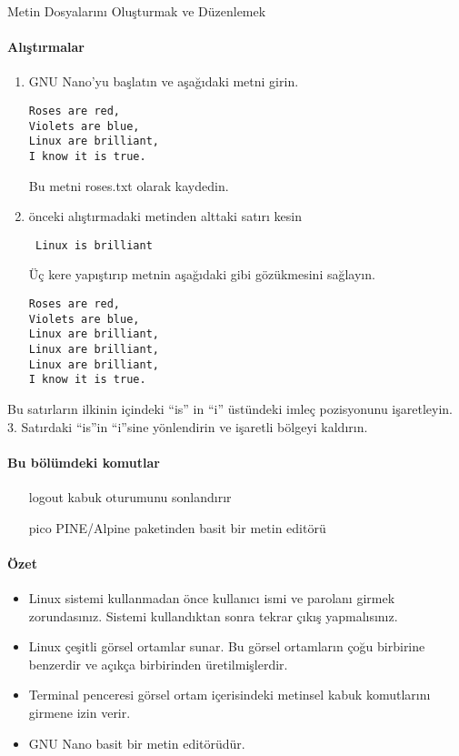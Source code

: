 \begin{section}{Metin Dosyalarını Oluşturmak ve Düzenlemek}
\paragraph{{\Huge{\PencilLeftDown}}Alıştırmalar}{
\begin{enumerate}
 \item GNU Nano’yu başlatın ve aşağıdaki metni girin.
 \begin{verbatim}
Roses are red,
Violets are blue,
Linux are brilliant,
I know it is true.
 \end{verbatim}Bu metni roses.txt olarak kaydedin.
 \item önceki alıştırmadaki metinden alttaki satırı kesin
 \begin{verbatim}
 Linux is brilliant
 \end{verbatim}
 Üç kere yapıştırıp metnin aşağıdaki gibi gözükmesini sağlayın.
 \begin{verbatim}
Roses are red,
Violets are blue,
Linux are brilliant,
Linux are brilliant,
Linux are brilliant,
I know it is true.
 \end{verbatim}
\end{enumerate}}
Bu satırların ilkinin içindeki “is” in “i” üstündeki imleç pozisyonunu işaretleyin. 3. Satırdaki “is”in “i”sine yönlendirin ve işaretli bölgeyi kaldırın.
\end{section}
\paragraph{Bu bölümdeki komutlar}{
\begin{itemize}
\item[logout]kabuk oturumunu sonlandırır
\item[pico]PINE/Alpine paketinden basit bir metin editörü
\end{itemize}}

\paragraph{Özet}{
\begin{itemize}
\item Linux sistemi kullanmadan önce kullanıcı ismi ve parolanı girmek zorundasınız. Sistemi kullandıktan sonra tekrar çıkış yapmalısınız.
\item Linux çeşitli görsel ortamlar sunar. Bu görsel ortamların çoğu birbirine benzerdir ve açıkça birbirinden üretilmişlerdir.
\item Terminal penceresi görsel ortam içerisindeki metinsel kabuk komutlarını girmene izin verir. 
\item GNU Nano basit bir metin editörüdür.
\end{itemize}
}